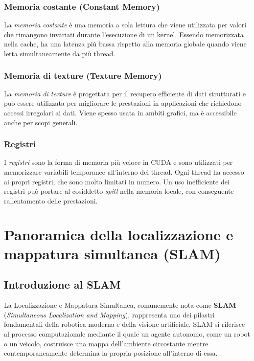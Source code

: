\documentclass[12pt,a4paper]{report}
\begin{document}
\subsection{Memoria costante (Constant Memory)}
La \textit{memoria costante} è una memoria a sola lettura che viene utilizzata per valori che rimangono invariati durante l'esecuzione di un kernel. Essendo memorizzata nella cache, ha una latenza più bassa rispetto alla memoria globale quando viene letta simultaneamente da più thread.

\subsection{Memoria di texture (Texture Memory)}
La \textit{memoria di texture} è progettata per il recupero efficiente di dati strutturati e può essere utilizzata per migliorare le prestazioni in applicazioni che richiedono accessi irregolari ai dati. Viene spesso usata in ambiti grafici, ma è accessibile anche per scopi generali.

\subsection{Registri}
I \textit{registri} sono la forma di memoria più veloce in CUDA e sono utilizzati per memorizzare variabili temporanee all'interno dei thread. Ogni thread ha accesso ai propri registri, che sono molto limitati in numero. Un uso inefficiente dei registri può portare al cosiddetto \textit{spill} nella memoria locale, con conseguente rallentamento delle prestazioni.







\chapter{Panoramica della localizzazione e mappatura simultanea (SLAM)}

\section{Introduzione al SLAM}

La Localizzazione e Mappatura Simultanea, comunemente nota come \textbf{SLAM} (\textit{Simultaneous Localization and Mapping}), rappresenta uno dei pilastri fondamentali della robotica moderna e della visione artificiale. SLAM si riferisce al processo computazionale mediante il quale un agente autonomo, come un robot o un veicolo, costruisce una mappa dell'ambiente circostante mentre contemporaneamente determina la propria posizione all'interno di essa.
\end{document}
